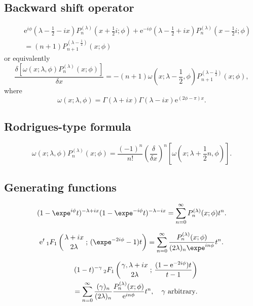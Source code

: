 \documentclass[envcountchap,graybox]{svmono}
\newcommand{\hyp}[5]{\mbox{}_{#1}{F}_{#2}
\left(\genfrac{}{}{0pt}{}{#3}{#4}\,;\,#5\right)}
\newcommand{\e}{\textrm{e}}
\renewcommand{\Gamma}{\varGamma}
\newcommand{\hyp}[5]{\,\mbox{}_{#1}F_{#2}\!\left(
  \genfrac{}{}{0pt}{}{#3}{#4};#5\right)}
\begin{document}
\subsection*{Backward shift operator}
\begin{eqnarray}
\label{shift2MPI}
& &\e^{i\phi}(\lambda-\textstyle\frac{1}{2}-ix)
P_n^{(\lambda)}(x+\textstyle\frac{1}{2}i;\phi)+
\e^{-i\phi}(\lambda-\textstyle\frac{1}{2}+ix)
P_n^{(\lambda)}(x-\textstyle\frac{1}{2}i;\phi)\nonumber\\
& &{}=(n+1)P_{n+1}^{(\lambda-\frac{1}{2})}(x;\phi)
\end{eqnarray}
or equivalently
\begin{equation}
\label{shift2MPII}
\frac{\delta\left[\omega(x;\lambda,\phi)P_n^{(\lambda)}(x;\phi)\right]}{\delta x}=
-(n+1)\omega(x;\lambda-\textstyle\frac{1}{2},\phi)
P_{n+1}^{(\lambda-\frac{1}{2})}(x;\phi),
\end{equation}
where
$$\omega(x;\lambda,\phi)=\Gamma(\lambda+ix)\Gamma(\lambda-ix)\e^{(2\phi-\pi)x}.$$

\subsection*{Rodrigues-type formula}
\begin{equation}
\label{RodMP}
\omega(x;\lambda,\phi)P_n^{(\lambda)}(x;\phi)=\frac{(-1)^n}{n!}
\left(\frac{\delta}{\delta x}\right)^n\left[\omega(x;\lambda+\textstyle\frac{1}{2}n,\phi)\right].
\end{equation}

\newpage

\subsection*{Generating functions}
\begin{equation}
\label{GenMP1}
(1-\expe^{i\phi}t)^{-\lambda+ix}(1-\expe^{-i\phi}t)^{-\lambda-ix}=
\sum_{n=0}^{\infty}P_n^{(\lambda)}(x;\phi)t^n.
\end{equation}

\begin{equation}
\label{GenMP2}
\e^t\,\hyp{1}{1}{\lambda+ix}{2\lambda}{(\expe^{-2i\phi}-1)t}=
\sum_{n=0}^{\infty}\frac{P_n^{(\lambda)}(x;\phi)}{(2\lambda)_n\expe^{in\phi}}t^n.
\end{equation}

\begin{eqnarray}
\label{GenMP3}
& &(1-t)^{-\gamma}\,\hyp{2}{1}{\gamma,\lambda+ix}{2\lambda}{\frac{(1-\e^{-2i\phi})t}{t-1}}\nonumber\\
& &{}=\sum_{n=0}^{\infty}\frac{(\gamma)_n}{(2\lambda)_n}\frac{P_n^{(\lambda)}(x;\phi)}{\e^{in\phi}}t^n,
\quad\textrm{$\gamma$ arbitrary}.
\end{eqnarray}
\end{document}
